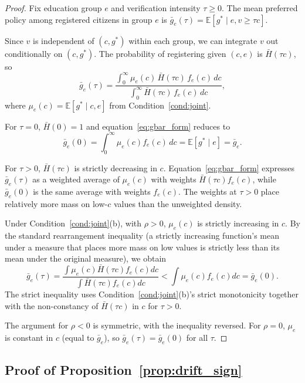 \begin{proof}
Fix education group $e$ and verification intensity $\tau \geq 0$. The mean preferred policy among registered citizens in group $e$ is $\bar g_e(\tau) = \mathbb{E}[g^* \mid e, v \geq \tau c]$.

Since $v$ is independent of $(c, g^*)$ within each group, we can integrate $v$ out conditionally on $(c, g^*)$. The probability of registering given $(c, e)$ is $\bar H(\tau c)$, so
\begin{equation}
\bar g_e(\tau) = \frac{\int_0^\infty \mu_e(c) \, \bar H(\tau c) \, f_e(c) \, dc}{\int_0^\infty \bar H(\tau c) \, f_e(c) \, dc},
\label{eq:gbar_form}
\end{equation}
where $\mu_e(c) = \mathbb{E}[g^* \mid c, e]$ from Condition~\ref{cond:joint}.

For $\tau = 0$, $\bar H(0) = 1$ and equation~\eqref{eq:gbar_form} reduces to
\[
\bar g_e(0) = \int_0^\infty \mu_e(c) f_e(c) \, dc = \mathbb{E}[g^* \mid e] = \bar g_e.
\]

For $\tau > 0$, $\bar H(\tau c)$ is strictly decreasing in $c$. Equation~\eqref{eq:gbar_form} expresses $\bar g_e(\tau)$ as a weighted average of $\mu_e(c)$ with weights $\bar H(\tau c) f_e(c)$, while $\bar g_e(0)$ is the same average with weights $f_e(c)$. The weights at $\tau > 0$ place relatively more mass on low-$c$ values than the unweighted density.

Under Condition~\ref{cond:joint}(b), with $\rho > 0$, $\mu_e(c)$ is strictly increasing in $c$. By the standard rearrangement inequality (a strictly increasing function's mean under a measure that places more mass on low values is strictly less than its mean under the original measure), we obtain
\[
\bar g_e(\tau) = \frac{\int \mu_e(c) \bar H(\tau c) f_e(c) dc}{\int \bar H(\tau c) f_e(c) dc} < \int \mu_e(c) f_e(c) dc = \bar g_e(0).
\]
The strict inequality uses Condition~\ref{cond:joint}(b)'s strict monotonicity together with the non-constancy of $\bar H(\tau c)$ in $c$ for $\tau > 0$.

The argument for $\rho < 0$ is symmetric, with the inequality reversed. For $\rho = 0$, $\mu_e$ is constant in $c$ (equal to $\bar g_e$), so $\bar g_e(\tau) = \bar g_e(0)$ for all $\tau$.
\end{proof}

\subsection{Proof of Proposition~\ref{prop:drift_sign}}
\label{ssec:proof_drift_sign}

